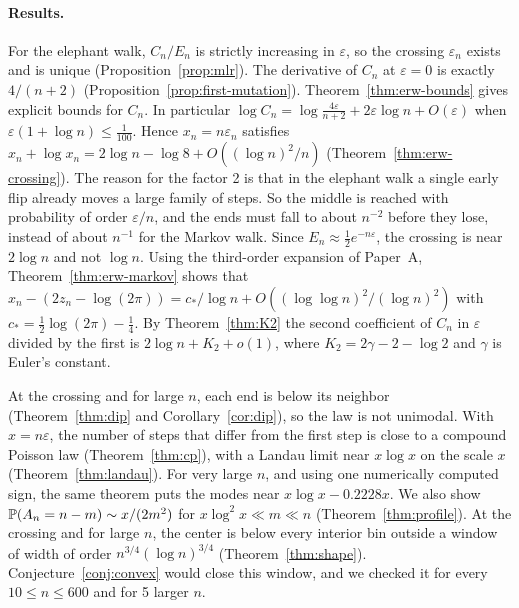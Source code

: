\paragraph{Results.}
For the elephant walk, $C_n/E_n$ is strictly increasing in $\varepsilon$, so
the crossing $\varepsilon_n$ exists and is unique
(Proposition~\ref{prop:mlr}). The derivative of $C_n$ at $\varepsilon=0$ is
exactly $4/(n+2)$ (Proposition~\ref{prop:first-mutation}).
Theorem~\ref{thm:erw-bounds} gives explicit bounds for $C_n$. In particular
$\log C_n=\log\frac{4\varepsilon}{n+2}+2\varepsilon\log n+O(\varepsilon)$
when $\varepsilon(1+\log n)\le\frac1{100}$. Hence $x_n=n\varepsilon_n$
satisfies $x_n+\log x_n=2\log n-\log8+O((\log n)^2/n)$
(Theorem~\ref{thm:erw-crossing}). The reason for the factor 2 is that in
the elephant walk a single early flip already moves a large family of
steps. So the middle is reached with probability of order $\varepsilon/n$,
and the ends must fall to about $n^{-2}$ before they lose, instead of about
$n^{-1}$ for the Markov walk. Since $E_n\approx\frac12e^{-n\varepsilon}$,
the crossing is near $2\log n$ and not $\log n$. Using the third-order
expansion of Paper~A, Theorem~\ref{thm:erw-markov} shows that
$x_n-(2z_n-\log(2\pi))=c_*/\log n+O((\log\log n)^2/(\log n)^2)$ with
$c_*=\frac12\log(2\pi)-\frac14$. By Theorem~\ref{thm:K2} the second
coefficient of $C_n$ in $\varepsilon$ divided by the first is
$2\log n+K_2+o(1)$, where $K_2=2\gamma-2-\log2$ and $\gamma$ is Euler's
constant.

At the crossing and for large $n$, each end is below its neighbor
(Theorem~\ref{thm:dip} and Corollary~\ref{cor:dip}), so the law is not
unimodal. With $x=n\varepsilon$,
the number of steps that differ from the first step is close to a compound
Poisson law (Theorem~\ref{thm:cp}), with a Landau limit near $x\log x$ on
the scale $x$ (Theorem~\ref{thm:landau}). For very large $n$, and using one
numerically computed sign, the same theorem puts the modes near
$x\log x-0.2228x$. We also show $\mathbb{P}(A_n=n-m)\sim x/(2m^2)$ for
$x\log^2x\ll m\ll n$ (Theorem~\ref{thm:profile}). At the crossing and for
large $n$, the center is below every interior bin outside a window of width of order
$n^{3/4}(\log n)^{3/4}$ (Theorem~\ref{thm:shape}).
Conjecture~\ref{conj:convex} would close this window, and we checked it for
every $10\le n\le600$ and for 5 larger $n$.

